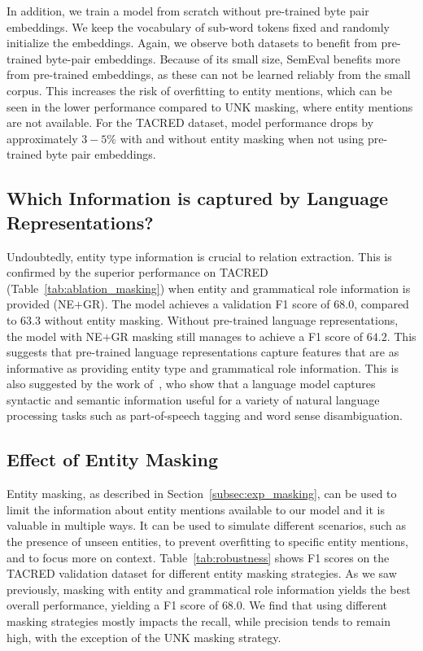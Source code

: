 \documentclass[akbc,twoside,11pt]{article}
\begin{document}
In addition, we train a model from scratch without pre-trained byte pair embeddings. We keep the vocabulary of sub-word tokens fixed and randomly initialize the embeddings. Again, we observe both datasets to benefit from pre-trained byte-pair embeddings. Because of its small size, SemEval benefits more from pre-trained embeddings, as these can not be learned reliably from the small corpus. This increases the risk of overfitting to entity mentions, which can be seen in the lower performance compared to UNK masking, where entity mentions are not available. For the TACRED dataset, model performance drops by approximately $3-5\%$ with and without entity masking when not using pre-trained byte pair embeddings. 


\subsection{Which Information is captured by Language Representations?}
Undoubtedly, entity type information is crucial to relation extraction. This is confirmed by the superior performance on TACRED (Table~\ref{tab:ablation_masking}) when entity and grammatical role information is provided (NE$+$GR). The model achieves a validation F1 score of $68.0$, compared to $63.3$ without entity masking. Without pre-trained language representations, the model with NE$+$GR masking still manages to achieve a F1 score of $64.2$. This suggests that pre-trained language representations capture features that are as informative as providing entity type and grammatical role information.
This is also suggested by the work of~\citet{peters_deepcw_2018}, who show that a language model captures syntactic and semantic information useful for a variety of natural language processing tasks such as part-of-speech tagging and word sense disambiguation.


\subsection{Effect of Entity Masking}
\label{subsec:effect_entity_masking}
Entity masking, as described in Section~\ref{subsec:exp_masking}, can be used to limit the information about entity mentions available to our model and it is valuable in multiple ways. It can be used to simulate different scenarios, such as the presence of unseen entities, to prevent overfitting to specific entity mentions, and to focus more on context. Table~\ref{tab:robustness} shows F1 scores on the TACRED validation dataset for different entity masking strategies. As we saw previously, masking with entity and grammatical role information yields the best overall performance, yielding a F1 score of $68.0$. We find that using different masking strategies mostly impacts the recall, while precision tends to remain high, with the exception of the UNK masking strategy. 
\end{document}
